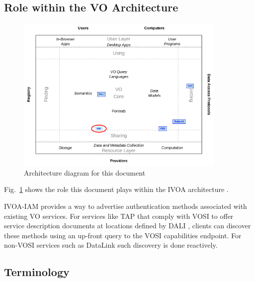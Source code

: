 \documentclass[11pt,a4paper]{ivoa}
\begin{document}
\subsection{Role within the VO Architecture}

\begin{figure}
\centering


\includegraphics[width=0.9\textwidth]{role_diagram.pdf}
\caption{Architecture diagram for this document}
\label{fig:archdiag}
\end{figure}

Fig.~\ref{fig:archdiag} shows the role this document plays within the
IVOA architecture \citep{2021ivoa.spec.1101D}.

IVOA-IAM provides a way to advertise authentication methods
associated with existing VO services.
For services like TAP \citep{2019ivoa.spec.0927D}
that comply with VOSI \citep{2017ivoa.spec.0524G} to
offer service description documents at locations
defined by DALI \citep{2017ivoa.spec.0517D},
clients can discover these methods
using an up-front query to the VOSI capabilities endpoint.
For non-VOSI services such as DataLink \citep{2015ivoa.spec.0617D}
such discovery is done reactively.


\subsection{Terminology}
\end{document}
